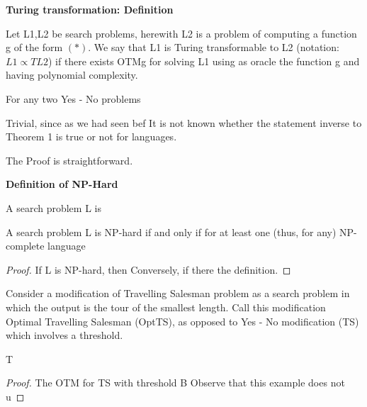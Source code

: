 \textbf{Turing transformation: Definition}\\
\begin{definition}
    Let L1,L2 be search problems,
    herewith L2 is a problem of computing
    a function g of the form $(\ast)$.
    We say that L1 is Turing transformable to L2
    (notation: $L1 \propto T L2$)
    if there exists OTMg for solving L1
    using as oracle the function g and having polynomial complexity.
\end{definition}

\begin{theorem}
    For any two Yes - No problems %
\begin{theorem}

Trivial, since as we had seen bef%
It is not known whether the statement inverse to Theorem 1 is true or not for languages.

\begin{theorem}
    The %
    Proof is straightforward.
\end{theorem}

\textbf{Definition of NP-Hard}\\
\begin{definition}
    A search problem L is %
\end{definition}
\begin{theorem}
    A search problem L is NP-hard if and only if for at least one (thus, for any)
    NP-complete language %
\end{theorem}
\begin{proof}
    If L is NP-hard, then%
    Conversely, if there %
    the definition.
\end{proof}
\begin{example}
    Consider a modification of Travelling Salesman problem
    as a search problem in which the output is the tour of the smallest length.
    Call this modification Optimal Travelling Salesman (OptTS),
    as opposed to Yes - No modification (TS) which involves a threshold.
\end{example}

\end{theorem}
    T%
\end{theorem}

\begin{proof}
    The OTM for TS with threshold B%
Observe that this example does not u%
\end{proof}
